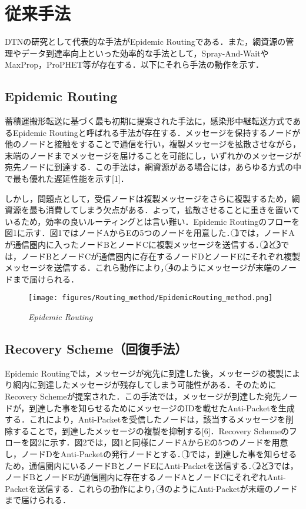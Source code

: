 \documentclass[11pt]{icsthesis}
\begin{document}
\section{従来手法}
DTNの研究として代表的な手法がEpidemic Routingである．また，網資源の管理やデータ到達率向上といった効率的な手法として，Spray-And-WaitやMaxProp，ProPHET等が存在する．以下にそれら手法の動作を示す．

\subsection{Epidemic Routing}
蓄積運搬形転送に基づく最も初期に提案された手法に，感染形中継転送方式であるEpidemic Routingと呼ばれる手法が存在する．メッセージを保持するノードが他のノードと接触をすることで通信を行い，複製メッセージを拡散させながら，末端のノードまでメッセージを届けることを可能にし，いずれかのメッセージが宛先ノードに到達する．この手法は，網資源がある場合には，あらゆる方式の中で最も優れた遅延性能を示す[1]．

しかし，問題点として，受信ノードは複製メッセージをさらに複製するため，網資源を最も消費してしまう欠点がある．よって，拡散させることに重きを置いているため，効率の良いルーティングとは言い難い．Epidemic Routingのフローを図1に示す．図1ではノードAからEの5つのノードを用意した．\textcircled{1}では，ノードAが通信圏内に入ったノードBとノードCに複製メッセージを送信する．\textcircled{2}と\textcircled{3}では，ノードBとノードCが通信圏内に存在するノードDとノードEにそれぞれ複製メッセージを送信する．これら動作により，\textcircled{4}のようにメッセージが末端のノードまで届けられる．

\begin{figure}[h]
	\centering
	\texttt{[image: figures/Routing\_method/EpidemicRouting\_method.png]}
	\caption[]{\it{Epidemic Routing}}
	\label{EpidemicRouting}
\end{figure}

\newpage

\subsection{Recovery Scheme（回復手法）}
Epidemic Routingでは，メッセージが宛先に到達した後，メッセージの複製により網内に到達したメッセージが残存してしまう可能性がある．そのためにRecovery Schemeが提案された．この手法では，メッセージが到達した宛先ノードが，到達した事を知らせるためにメッセージのIDを載せたAnti-Packetを生成する．これにより，Anti-Packetを受信したノードは，該当するメッセージを削除することで，到達したメッセージの複製を抑制する[6]．Recovery Schemeのフローを図2に示す．図2では，図1と同様にノードAからEの5つのノードを用意し，ノードDをAnti-Packetの発行ノードとする．\textcircled{1}では，到達した事を知らせるため，通信圏内にいるノードBとノードEにAnti-Packetを送信する．\textcircled{2}と\textcircled{3}では，ノードBとノードEが通信圏内に存在するノードAとノードCにそれぞれAnti-Packetを送信する．これらの動作により，\textcircled{4}のようにAnti-Packetが末端のノードまで届けられる．
\end{document}
